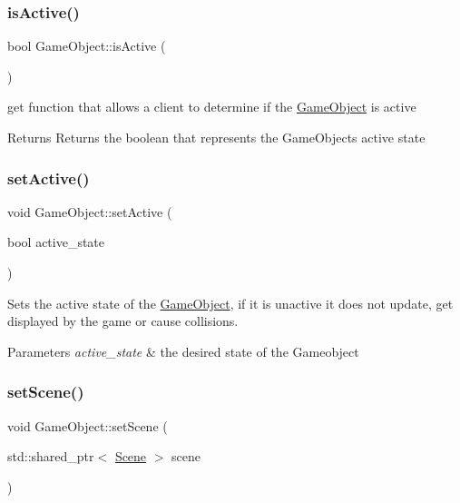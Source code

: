 \subsubsection{\texorpdfstring{is\+Active()}{isActive()}}
{\footnotesize\ttfamily bool Game\+Object\+::is\+Active (\begin{DoxyParamCaption}{ }\end{DoxyParamCaption})\hspace{0.3cm}{\ttfamily [inline]}}



get function that allows a client to determine if the \hyperlink{class_game_object}{Game\+Object} is active 

\begin{DoxyReturn}{Returns}
Returns the boolean that represents the Game\+Objects active state 
\end{DoxyReturn}
\mbox{\label{class_game_object_a200218792aa0076011d69be696e3d3d4}} 
\subsubsection{\texorpdfstring{set\+Active()}{setActive()}}
{\footnotesize\ttfamily void Game\+Object\+::set\+Active (\begin{DoxyParamCaption}\item[{bool}]{active\+\_\+state }\end{DoxyParamCaption})\hspace{0.3cm}{\ttfamily [inline]}}



Sets the active state of the \hyperlink{class_game_object}{Game\+Object}, if it is unactive it does not update, get displayed by the game or cause collisions. 


\begin{DoxyParams}{Parameters}
{\em active\+\_\+state} & the desired state of the Gameobject \\
\hline
\end{DoxyParams}
\mbox{\label{class_game_object_a9e1420c027ce937f9958a41ad280080b}} 
\subsubsection{\texorpdfstring{set\+Scene()}{setScene()}}
{\footnotesize\ttfamily void Game\+Object\+::set\+Scene (\begin{DoxyParamCaption}\item[{std\+::shared\+\_\+ptr$<$ \hyperlink{class_scene}{Scene} $>$}]{scene }\end{DoxyParamCaption})\hspace{0.3cm}{\ttfamily [inline]}}



